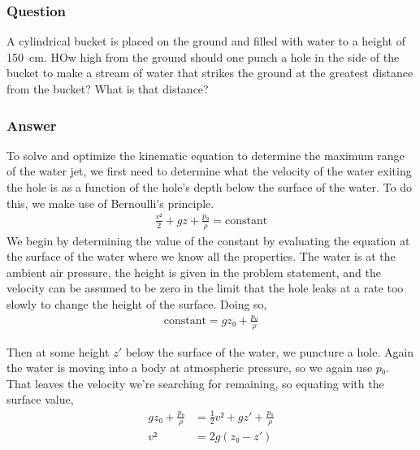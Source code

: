 \subsubsection{Question}

A cylindrical bucket is placed on the ground and filled with water to a
height of \SI{150}{\cm}. HOw high from the ground should one punch a hole in
the side of the bucket to make a stream of water that strikes the ground at
the greatest distance from the bucket? What is that distance?

\subsubsection{Answer}

To solve and optimize the kinematic equation to determine the maximum range
of the water jet, we first need to determine what the velocity of the water
exiting the hole is as a function of the hole's depth below the surface of the
water. To do this, we make use of Bernoulli's principle.
\begin{align*}
    \frac{v²}{2} + gz + \frac{p₀}{ρ} = \text{constant}
\end{align*}
We begin by determining the value of the constant by evaluating the equation
at the surface of the water where we know all the properties. The water is
at the ambient air pressure, the height is given in the problem statement,
and the velocity can be assumed to be zero in the limit that the hole leaks
at a rate too slowly to change the height of the surface. Doing so,
\begin{align*}
    \text{constant} = gz₀ + \frac{p₀}{ρ}
\end{align*}

Then at some height $z'$ below the surface of the water, we puncture a hole.
Again the water is moving into a body at atmospheric pressure, so we again
use $p₀$. That leaves the velocity we're searching for remaining, so equating
with the surface value,
\begin{align*}
    gz₀ + \frac{p₀}{ρ} &= \frac 12 v² + gz' + \frac{p₀}{ρ} \\
    v² &= 2g(z₀ - z')
\end{align*}

